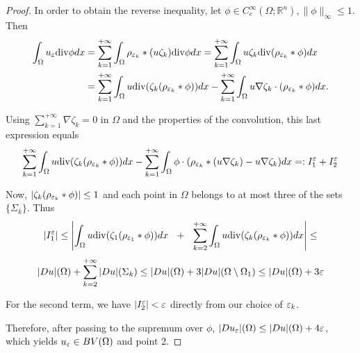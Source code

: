 \begin{proof}
In order to obtain the reverse inequality, let $\phi \in C^{\infty}_{c}(\Omega; \mathbb{R}^{n}), \|\phi\|_{\infty} \le 1$. Then
\begin{align*} \int_{\Omega} u_{\varepsilon} \mathrm{div}\phi dx & = \sum_{k=1}^{+\infty} \int_{\Omega} \rho_{\varepsilon_{k}} \ast (u\zeta_{k}) \mathrm{div}\phi dx = \sum_{k=1}^{+\infty} \int_{\Omega} u \zeta_{k} \mathrm{div}(\rho_{\varepsilon_{k}} \ast \phi) dx \\
& = \sum_{k=1}^{+\infty} \int_{\Omega} u \mathrm{div}(\zeta_{k} (\rho_{\varepsilon_{k}} \ast \phi)) dx - \sum_{k=1}^{+\infty} \int_{\Omega} u \nabla \zeta_{k} \cdot (\rho_{\varepsilon_{k}} \ast \phi) dx. 
\end{align*}

Using $\displaystyle \sum_{k = 1}^{+\infty} \nabla \zeta_{k} = 0$ in $\Omega$ and the properties of the convolution, this last expression equals
\[ \sum_{k=1}^{+\infty} \int_{\Omega} u \mathrm{div}(\zeta_{k} (\rho_{\varepsilon_{k}} \ast \phi)) dx - \sum_{k=1}^{+\infty} \int_{\Omega} \phi \cdot (\rho_{\varepsilon_{k}} \ast (u \nabla \zeta_{k}) - u \nabla \zeta_{k}) dx =: I_{1}^{\varepsilon} + I_{2}^{\varepsilon} \] 

Now, $|\zeta_{k}(\rho_{\varepsilon_{k}} \ast \phi)| \le 1$ and each point in $\Omega$ belongs to at most three of the sets $\{\Sigma_{k}\}$. Thus
\[ |I_{1}^{\varepsilon}| \le \left |\int_{\Omega} u \mathrm{div}(\zeta_{1} (\rho_{\varepsilon_{1}} \ast \phi)) dx \ \ + \ \ \sum_{k=2}^{+\infty} \int_{\Omega} u \mathrm{div}(\zeta_{k} (\rho_{\varepsilon_{k}} \ast \phi)) dx \right | \le \]
\[ |Du|(\Omega) + \sum_{k = 2}^{+\infty} |Du|(\Sigma_{k}) \le |Du|(\Omega) + 3|Du|(\Omega \setminus \Omega_{1}) \le |Du|(\Omega) + 3 \varepsilon \]

For the second term, we have $|I_{2}^{\varepsilon}| < \varepsilon$ directly from our choice of $\varepsilon_{k}$.

Therefore, after passing to the supremum over $\phi$, $|Du_{\varepsilon}|(\Omega) \le |Du|(\Omega) + 4 \varepsilon$, which yields $u_{\varepsilon} \in BV(\Omega)$ and point 2. 
\end{proof}

